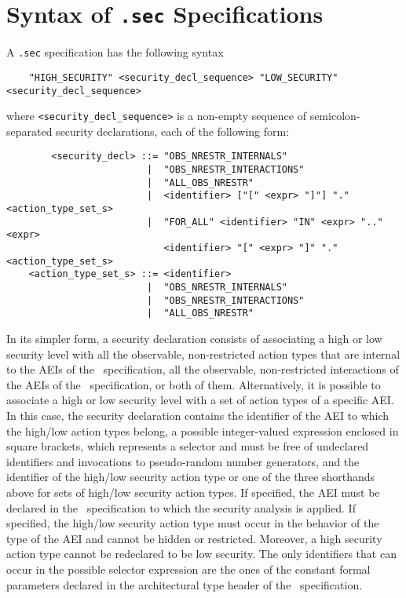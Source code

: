 \section{Syntax of {\tt .sec} Specifications}

A {\tt .sec} specification has the following syntax

	\begin{verbatim}
    "HIGH_SECURITY" <security_decl_sequence> "LOW_SECURITY" <security_decl_sequence>
	\end{verbatim}

\noindent where {\tt <security\_decl\_sequence>} is a non-empty sequence of semicolon-separated security
declarations, each of the following form:

        \begin{verbatim}
        <security_decl> ::= "OBS_NRESTR_INTERNALS"
                         |  "OBS_NRESTR_INTERACTIONS"
                         |  "ALL_OBS_NRESTR"
                         |  <identifier> ["[" <expr> "]"] "." <action_type_set_s>
                         |  "FOR_ALL" <identifier> "IN" <expr> ".." <expr>
                            <identifier> "[" <expr> "]" "." <action_type_set_s>
    <action_type_set_s> ::= <identifier>
                         |  "OBS_NRESTR_INTERNALS"
                         |  "OBS_NRESTR_INTERACTIONS"
                         |  "ALL_OBS_NRESTR"
        \end{verbatim}

In its simpler form, a security declaration consists of associating a high or low security level with all
the observable, non-restricted action types that are internal to the AEIs of the \aemilia\ specification,
all the observable, non-restricted interactions of the AEIs of the \aemilia\ specification, or both of them.
Alternatively, it is possible to associate a high or low security level with a set of action types of a
specific AEI. In this case, the security declaration contains the identifier of the AEI to which the
high/low action types belong, a possible integer-valued expression enclosed in square brackets, which
represents a selector and must be free of undeclared identifiers and invocations to pseudo-random number
generators, and the identifier of the high/low security action type or one of the three shorthands above for
sets of high/low security action types. If specified, the AEI must be declared in the \aemilia\
specification to which the security analysis is applied. If specified, the high/low security action type
must occur in the behavior of the type of the AEI and cannot be hidden or restricted. Moreover, a high
security action type cannot be redeclared to be low security. The only identifiers that can occur in the
possible selector expression are the ones of the constant formal parameters declared in the architectural
type header of the \aemilia\ specification.

